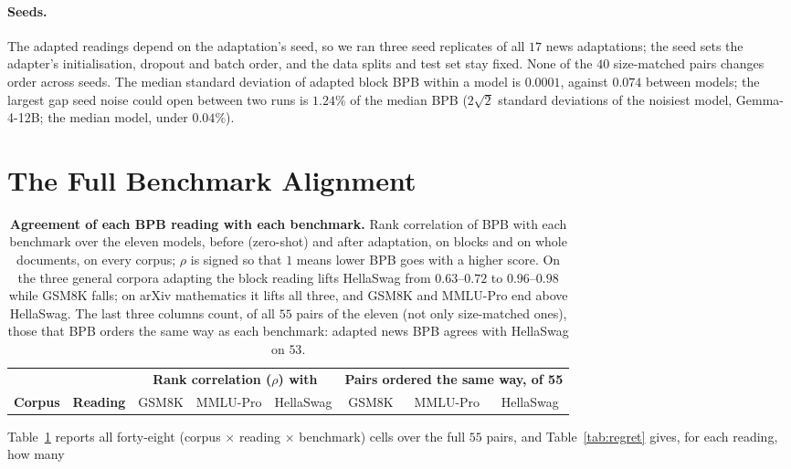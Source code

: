 \documentclass[10pt]{article}
\begin{document}
\paragraph{Seeds.} The adapted readings depend on the adaptation's seed, so we ran three seed
replicates of all $17$ news adaptations; the seed sets the adapter's initialisation, dropout and
batch order, and the data splits and test set stay fixed. None of the $40$ size-matched pairs
changes order across seeds. The median standard deviation of adapted block BPB within a model is
$0.0001$, against $0.074$ between models; the largest gap seed noise could open between two runs is
$1.24\%$ of the median BPB ($2\sqrt{2}$ standard deviations of the noisiest model,
Gemma-4-12B; the median model, under $0.04\%$).

\section{The Full Benchmark Alignment}
\label{app:alignment}
\begin{table}[ht]
\centering\small
\begin{tabular}{llcccccc}
\toprule
& & \multicolumn{3}{c}{\textbf{Rank correlation ($\rho$) with}} & \multicolumn{3}{c}{\textbf{Pairs ordered the same way, of 55}} \\
\cmidrule(lr){3-5}\cmidrule(lr){6-8}
\textbf{Corpus} & \textbf{Reading} & GSM8K & MMLU-Pro & HellaSwag & GSM8K & MMLU-Pro & HellaSwag \\
\midrule

\bottomrule
\end{tabular}
\caption{\textbf{Agreement of each BPB reading with each benchmark.} Rank correlation of BPB with
each benchmark over the eleven models, before (zero-shot) and after adaptation, on blocks and on
whole documents, on every corpus;
$\rho$ is signed so that $1$ means lower BPB goes with a higher score. On the three general corpora
adapting the block reading lifts HellaSwag from $0.63$--$0.72$ to $0.96$--$0.98$ while GSM8K falls; on arXiv
mathematics it lifts all three, and GSM8K and MMLU-Pro end above HellaSwag. The last three columns
count, of all $55$ pairs of the eleven (not only size-matched ones), those that BPB orders the same
way as each benchmark: adapted news BPB agrees with HellaSwag on $53$.}
\label{tab:alignment}
\end{table}
Table~\ref{tab:alignment} reports all forty-eight (corpus $\times$ reading $\times$ benchmark)
cells over the full $55$ pairs, and Table~\ref{tab:regret} gives, for each reading, how many
\end{document}
